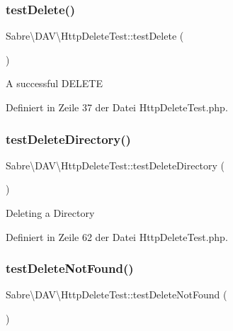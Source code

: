 \subsubsection{\texorpdfstring{test\+Delete()}{testDelete()}}
{\footnotesize\ttfamily Sabre\textbackslash{}\+D\+A\+V\textbackslash{}\+Http\+Delete\+Test\+::test\+Delete (\begin{DoxyParamCaption}{ }\end{DoxyParamCaption})}

A successful D\+E\+L\+E\+TE 

Definiert in Zeile 37 der Datei Http\+Delete\+Test.\+php.

\mbox{\label{class_sabre_1_1_d_a_v_1_1_http_delete_test_a41eb5909cc756f2fe9d1a77f7be0028e}} 
\subsubsection{\texorpdfstring{test\+Delete\+Directory()}{testDeleteDirectory()}}
{\footnotesize\ttfamily Sabre\textbackslash{}\+D\+A\+V\textbackslash{}\+Http\+Delete\+Test\+::test\+Delete\+Directory (\begin{DoxyParamCaption}{ }\end{DoxyParamCaption})}

Deleting a Directory 

Definiert in Zeile 62 der Datei Http\+Delete\+Test.\+php.

\mbox{\label{class_sabre_1_1_d_a_v_1_1_http_delete_test_a787fc5631302dba4115e08f1405b34ab}} 
\subsubsection{\texorpdfstring{test\+Delete\+Not\+Found()}{testDeleteNotFound()}}
{\footnotesize\ttfamily Sabre\textbackslash{}\+D\+A\+V\textbackslash{}\+Http\+Delete\+Test\+::test\+Delete\+Not\+Found (\begin{DoxyParamCaption}{ }\end{DoxyParamCaption})}

